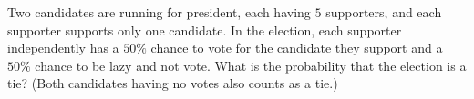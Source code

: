Two candidates are running for president, each having $5$ supporters, and each supporter supports only one candidate. In the election, each supporter independently has a $50\%$ chance to vote for the candidate they support and a $50\%$ chance to be lazy and not vote. What is the probability that the election is a tie? (Both candidates having no votes also counts as a tie.)
